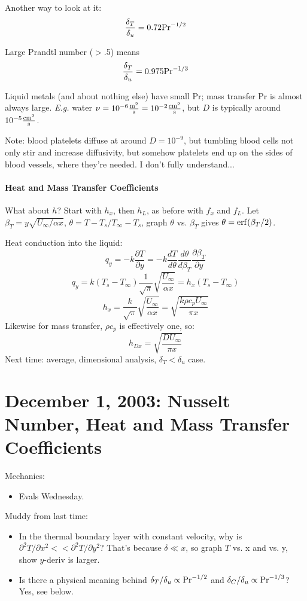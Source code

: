 \documentclass{report}
\begin{document}
Another way to look at it:
$$\frac{\delta_T}{\delta_u} = 0.72{\rm Pr}^{-1/2}$$

Large Prandtl number ($>$.5) means
$$\frac{\delta_T}{\delta_u} = 0.975{\rm Pr}^{-1/3}$$

Liquid metals (and about nothing else) have small Pr; mass transfer Pr is
almost always large.  {\em E.g.} water $\rm\nu = 10^{-6}\frac{m^2}{s} =
10^{-2}\frac{cm^2}{s}$, but $D$ is typically around $\rm10^{-5}\frac{cm^2}{s}$.

Note: blood platelets diffuse at around $D=10^{-9}$, but tumbling blood cells
not only stir and increase diffusivity, but somehow platelets end up on the
sides of blood vessels, where they're needed.  I don't fully understand...

\paragraph{Heat and Mass Transfer Coefficients}

What about $h$?  Start with $h_x$, then $h_L$, as before with $f_x$ and $f_L$.
Let $\beta_T=y\sqrt{U_\infty/\alpha x}$, $\theta=T-T_s/T_\infty-T_s$, graph $\theta$
vs. $\beta_T$ gives $\theta = {\rm erf}(\beta_T/2)$.

Heat conduction into the liquid:
$$q_y = -k\frac{\partial T}{\partial y} =
-k\frac{dT}{d\theta}\frac{d\theta}{d\beta_T}
\frac{\partial\beta_T}{\partial y}$$
$$q_y = k(T_s-T_\infty)\frac{1}{\sqrt{\pi}}\sqrt{\frac{U_\infty}{\alpha x}} =
h_x(T_s-T_\infty)$$
$$h_x = \frac{k}{\sqrt{\pi}}\sqrt{\frac{U_\infty}{\alpha x}} =
\sqrt{\frac{k\rho c_p U_\infty}{\pi x}}$$
Likewise for mass transfer, $\rho c_p$ is effectively one, so:
$$h_{Dx} = \sqrt{\frac{DU_\infty}{\pi x}}$$
Next time: average, dimensional analysis, $\delta_T<\delta_u$ case.
\newpage


\section{December 1, 2003: Nusselt Number, Heat and Mass Transfer Coefficients}

Mechanics:
\begin{itemize}
\item Evals Wednesday.
\end{itemize}
Muddy from last time:
\begin{itemize}
\item In the thermal boundary layer with constant velocity, why is $\partial^2
  T/\partial x^2<<\partial^2 T/\partial y^2$?  That's because $\delta\ll x$, so
  graph $T$ vs. x and vs. y, show $y$-deriv is larger.
\item Is there a physical meaning behind $\delta_T/\delta_u\propto
  {\rm Pr}^{-1/2}$ and $\delta_C/\delta_u\propto{\rm Pr}^{-1/3}$?  Yes, see
  below.
\end{itemize}
\end{document}
